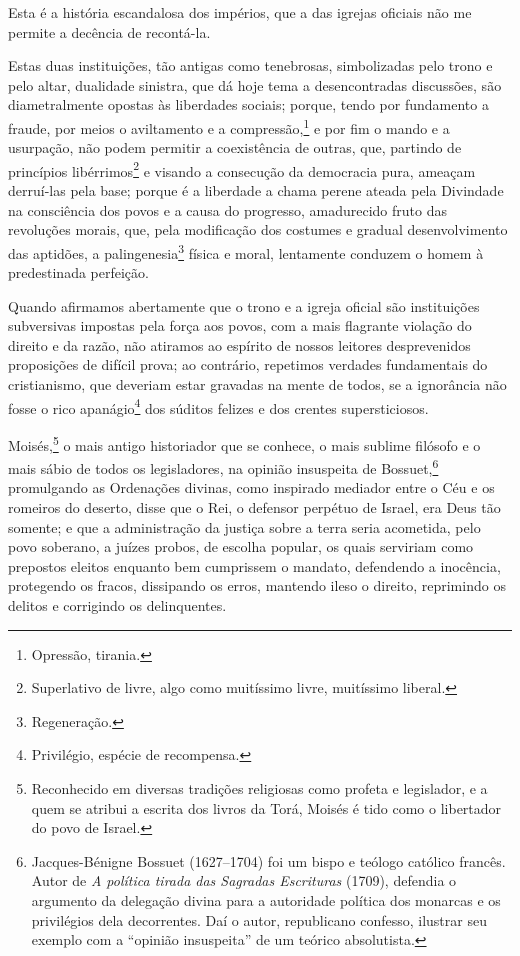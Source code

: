 Esta é a história escandalosa dos impérios, que a das igrejas oficiais
não me permite a decência de recontá-la.

Estas duas instituições, tão antigas como tenebrosas, simbolizadas pelo
trono e pelo altar, dualidade sinistra, que dá hoje tema a
desencontradas discussões, são diametralmente opostas às liberdades
sociais; porque, tendo por fundamento a fraude, por meios o aviltamento
e a compressão,\footnote{Opressão, tirania.} e por fim o mando e a
usurpação, não podem permitir a coexistência de outras, que, partindo de
princípios libérrimos\footnote{Superlativo de livre, algo como
  muitíssimo livre, muitíssimo liberal.} e visando a consecução da
democracia pura, ameaçam derruí-las pela base; porque é a liberdade a
chama perene ateada pela Divindade na consciência dos povos e a causa do
progresso, amadurecido fruto das revoluções morais, que, pela
modificação dos costumes e gradual desenvolvimento das aptidões, a
palingenesia\footnote{Regeneração.} física e moral, lentamente
conduzem o homem à predestinada perfeição.

Quando afirmamos abertamente que o trono e a igreja oficial são
instituições subversivas impostas pela força aos povos, com a mais
flagrante violação do direito e da razão, não atiramos ao espírito de
nossos leitores desprevenidos proposições de difícil prova; ao
contrário, repetimos verdades fundamentais do cristianismo, que deveriam
estar gravadas na mente de todos, se a ignorância não fosse o rico
apanágio\footnote{Privilégio, espécie de recompensa.} dos súditos
felizes e dos crentes supersticiosos.

Moisés,\footnote{Reconhecido em diversas tradições religiosas como
  profeta e legislador, e a quem se atribui a escrita dos livros da
  Torá, Moisés é tido como o libertador do povo de Israel.} o mais
antigo historiador que se conhece, o mais sublime filósofo e o mais
sábio de todos os legisladores, na opinião insuspeita de
Bossuet,\footnote{Jacques-Bénigne Bossuet (1627--1704) foi um bispo e
  teólogo católico francês. Autor de \emph{A política tirada das
  Sagradas Escrituras} (1709), defendia o argumento da delegação divina
  para a autoridade política dos monarcas e os privilégios dela
  decorrentes. Daí o autor, republicano confesso, ilustrar seu exemplo
  com a ``opinião insuspeita'' de um teórico absolutista.} promulgando as
Ordenações divinas, como inspirado mediador entre o Céu e os romeiros do
deserto, disse que o Rei, o defensor perpétuo de Israel, era Deus tão
somente; e que a administração da justiça sobre a terra seria acometida,
pelo povo soberano, a juízes probos, de escolha popular, os quais
serviriam como prepostos eleitos enquanto bem cumprissem o mandato,
defendendo a inocência, protegendo os fracos, dissipando os erros,
mantendo ileso o direito, reprimindo os delitos e corrigindo os
delinquentes.

